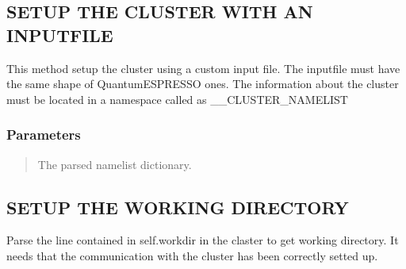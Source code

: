 \documentclass[a4paper,11pt,english]{sphinxmanual}
\begin{document}
\begin{fulllineitems}
\begin{fulllineitems}
\end{fulllineitems}


\begin{fulllineitems}
\label{\detokenize{apireference:sscha.Cluster.Cluster.setup_from_namelist}}
\pysigstartsignatures
{}
\pysigstopsignatures

\subsection{SETUP THE CLUSTER WITH AN INPUTFILE}
\label{\detokenize{apireference:setup-the-cluster-with-an-inputfile}}
\sphinxAtStartPar
This method setup the cluster using a custom input file.
The inputfile must have the same shape of QuantumESPRESSO ones.
The information about the cluster must be located in a namespace called
as \_\_CLUSTER\_NAMELIST


\subsubsection{Parameters}
\label{\detokenize{apireference:id63}}\begin{quote}
\begin{description}
\sphinxAtStartPar
The parsed namelist dictionary.

\end{description}
\end{quote}

\end{fulllineitems}


\begin{fulllineitems}
\label{\detokenize{apireference:sscha.Cluster.Cluster.setup_workdir}}
\pysigstartsignatures
{}
\pysigstopsignatures

\subsection{SETUP THE WORKING DIRECTORY}
\label{\detokenize{apireference:setup-the-working-directory}}
\sphinxAtStartPar
Parse the line contained in self.workdir in the claster to get working directory.
It needs that the communication with the cluster has been correctly setted up.


\end{fulllineitems}
\end{fulllineitems}
\end{document}
